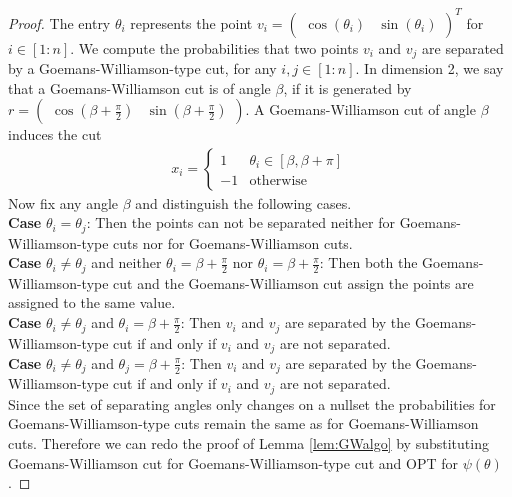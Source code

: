 \documentclass[12pt,a4paper]{article}
\theoremstyle{mythm}
\begin{document}
\begin{proof}
The entry $ \theta_i $ represents the point
$
v_i =
\begin{pmatrix}
\cos( \theta_i ) &
\sin( \theta_i ) 
\end{pmatrix} ^{ T }  
$ for $ i \in \left[ 1:n \right]  $.
We compute the probabilities that two points $ v_i $ and $ v_j $ are separated by a Goemans-Williamson-type cut, for any $ i,j \in \left[ 1:n \right]  $. 
In dimension 2, we say that a Goemans-Williamson cut is of angle $ \beta $, if it is generated by 
$ r = \begin{pmatrix}
\cos( \beta + \frac{ \pi  }{ 2 }  ) & \sin( \beta + \frac{ \pi  }{ 2 }  )
\end{pmatrix}  $.
A Goemans-Williamson cut of angle $ \beta $ induces the cut
\begin{align*}
x_i = 
\begin{cases}
1 & \theta_i \in \left[ \beta , \beta + \pi  \right] \\
-1 & \text{otherwise} 
\end{cases}
\end{align*} 
Now fix any angle $ \beta $ and distinguish the following cases. \\
\textbf{Case}  $ \theta_i = \theta_j $: 
Then the points can not be separated neither for Goemans-Williamson-type cuts nor for Goemans-Williamson cuts. \\
\textbf{Case}  $ \theta_i \neq \theta_j  $ and neither $ \theta_i = \beta + \frac{ \pi  }{ 2 }  $ nor $ \theta_i = \beta + \frac{ \pi  }{ 2 }  $:
Then both the Goemans-Williamson-type cut and the Goemans-Williamson cut assign the points are assigned to the same value. \\
\textbf{Case}  $ \theta_i \neq \theta_j  $ and $ \theta_i = \beta + \frac{ \pi  }{ 2 }  $:
Then $ v_i $ and $ v_j $ are separated by the Goemans-Williamson-type cut if and only if $ v_i $ and $ v_j $ are not separated. \\
\textbf{Case}  $ \theta_i \neq \theta_j  $ and $ \theta_j = \beta + \frac{ \pi  }{ 2 }  $:
Then $ v_i $ and $ v_j $ are separated by the Goemans-Williamson-type cut if and only if $ v_i $ and $ v_j $ are not separated. \\
Since the set of separating angles only changes on a nullset the probabilities for Goemans-Williamson-type cuts remain the same as for Goemans-Williamson cuts.
Therefore we can redo the proof of Lemma \ref{lem:GWalgo} by substituting Goemans-Williamson cut for Goemans-Williamson-type cut and OPT for $ \psi ( \theta) $.

\end{proof}
\end{document}

